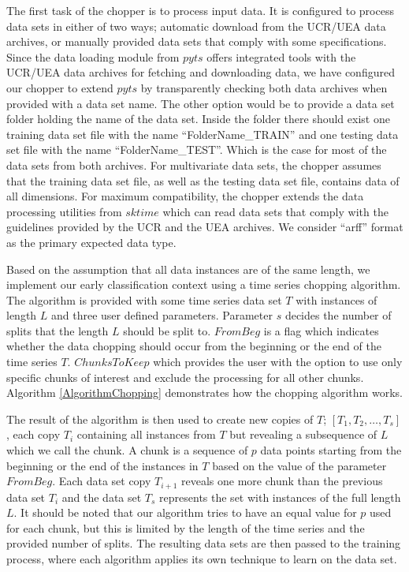 The first task of the chopper is to process input data.
It is configured to process data sets in either of two ways; automatic download from the UCR/UEA data archives,
or manually provided data sets that comply with some specifications.
Since the data loading module from $pyts$ \cite{JMLR:v21:19-763} offers integrated tools with the UCR/UEA data archives for fetching and downloading data,
we have configured our chopper to extend $pyts$ by transparently checking both data archives when provided with a data set name.
The other option would be to provide a data set folder holding the name of the data set.
Inside the folder there should exist one training data set file with the name \enquote{FolderName\_TRAIN} and one testing data set file with the name \enquote{FolderName\_TEST}.
Which is the case for most of the data sets from both archives.
For multivariate data sets, the chopper assumes that the training data set file, as well as the testing data set file, contains data of all dimensions.
For maximum compatibility, the chopper extends the data processing utilities from $sktime$ \cite{loning2019sktime}
which can read data sets that comply with the guidelines provided by the UCR and the UEA archives.
We consider \enquote{arff} format as the primary expected data type.

Based on the assumption that all data instances are of the same length, we implement our early classification context using a time series chopping algorithm.
The algorithm is provided with some time series data set $T$ with instances of length $L$ and three user defined parameters.
Parameter $s$ decides the number of splits that the length $L$ should be split to.
$FromBeg$ is a flag which indicates whether the data chopping should occur from the beginning or the end of the time series $T$.
$ChunksToKeep$ which provides the user with the option to use only specific chunks of interest and exclude the processing for all other chunks.
Algorithm \ref{AlgorithmChopping} demonstrates how the chopping algorithm works.

The result of the algorithm is then used to create new copies of $T$; $[T_{1}, T_{2}, \ldots, T_{s}]$, each copy $T_{i}$ containing all instances from $T$ but revealing a subsequence of $L$
which we call the chunk. A chunk is a sequence of $p$ data points starting from the beginning or the end of the instances in $T$ based on the value of the parameter $FromBeg$.
Each data set copy $T_{i+1}$ reveals one more chunk than the previous data set $T_{i}$ and the data set $T_{s}$ represents the set with instances of the full length $L$.
It should be noted that our algorithm tries to have an equal value for $p$ used for each chunk, but this is limited by the length of the time series and the provided number of splits.
The resulting data sets are then passed to the training process, where each algorithm applies its own technique to learn on the data set.

